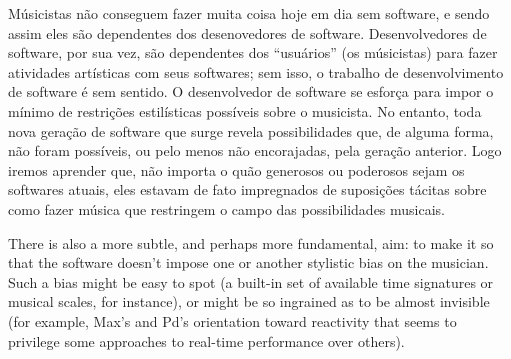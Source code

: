 \begin{citacao}
Músicistas não conseguem fazer muita coisa hoje em dia sem software, e sendo assim eles são dependentes dos desenovedores de software. Desenvolvedores de software, por sua vez, são dependentes dos ``usuários'' (os músicistas) para fazer atividades artísticas com seus softwares; sem isso, o trabalho de desenvolvimento de software é sem sentido. O desenvolvedor de software se esforça para impor o mínimo de restrições estilísticas possíveis sobre o musicista. No entanto, toda nova geração de software que surge revela possibilidades que, de alguma forma, não foram possíveis, ou pelo menos não encorajadas, pela geração anterior. Logo iremos aprender que, não importa o quão generosos ou poderosos sejam os softwares atuais, eles estavam de fato impregnados de suposições tácitas sobre como fazer música que restringem o campo das possibilidades musicais.

\end{citacao}

\begin{citacao}
There is also a more subtle, and perhaps more fundamental, aim: to make it so that the software doesn’t impose one or another stylistic bias on the musician. Such a bias might be easy to spot (a built-in set of available time signatures or musical scales, for instance), or might be so ingrained as to be almost invisible (for example, Max’s and Pd’s orientation toward reactivity that seems to privilege some approaches to real-time performance over others).
\end{citacao}

